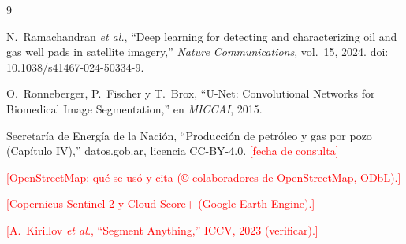 \documentclass[10pt,a4paper]{article}
\newcommand{\pend}[1]{\textcolor{red}{[#1]}}
\begin{document}

\begin{thebibliography}{9}

N.~Ramachandran \emph{et al.}, ``Deep learning for detecting and characterizing oil and gas well pads in satellite imagery,''
\emph{Nature Communications}, vol.~15, 2024. doi: 10.1038/s41467-024-50334-9.

O.~Ronneberger, P.~Fischer y T.~Brox, ``U-Net: Convolutional Networks for Biomedical Image Segmentation,''
en \emph{MICCAI}, 2015.

Secretaría de Energía de la Nación, ``Producción de petróleo y gas por pozo (Capítulo IV),'' datos.gob.ar, licencia CC-BY-4.0.
\pend{fecha de consulta}

\pend{OpenStreetMap: qué se usó y cita (© colaboradores de OpenStreetMap, ODbL).}

\pend{Copernicus Sentinel-2 y Cloud Score+ (Google Earth Engine).}

\pend{A.~Kirillov \emph{et al.}, ``Segment Anything,'' ICCV, 2023 (verificar).}

\end{thebibliography}
\end{document}
